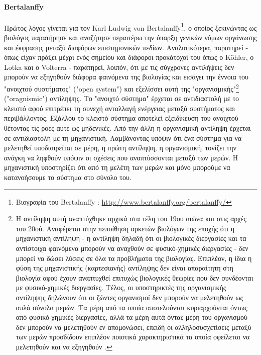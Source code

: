 \documentclass[a4paper,12pt,twoside]{report}
\begin{document}
{			\paragraph{Bertalanffy}{Πρώτος λόγος γίνεται για τον Karl Ludwig von Bertalanffy\footnote{Βιογραφία του Bertalanffy : \url{http://www.bertalanffy.org/bertalanffy/}}, ο οποίος ξεκινώντας ως βιολόγος παρατήρησε και αναζήτησε περαιτέρω την ύπαρξη γενικών νόμων οργάνωσης και έκφρασης μεταξύ διαφόρων επιστημονικών πεδίων. Αναλυτικότερα, παρατηρεί - όπως είχαν πράξει μέχρι ενός σημείου και διάφοροι προκάτοχοί του όπως ο K\"ohler, ο Lotka και ο Volterra \cite[σελ. 11]{GeneralSystemsTheory:Bertalanffy1972} \cite[σελ. 412]{TheHistoryΑndStatusΟfGeneralSystemsTheory:Bertalanffy} - παρατηρεί, λοιπόν, ότι με τις σύγχρονες αντιλήψεις δεν μπορούν να εξηγηθούν διάφορα φαινόμενα της βιολογίας και εισάγει την έννοια του "ανοιχτού συστήματος" ("open system") και εξελίσσει αυτή της "οργανισμικής"\footnote{Η αντίληψη αυτή αναπτύχθηκε αρχικά στα τέλη του 19ου αιώνα και στις αρχές του 20ού. Αναφέρεται στην πεποίθηση αρκετών βιολόγων της εποχής ότι η μηχανιστική αντίληψη - η αντίληψη δηλαδή ότι οι βιολογικές διεργασίες και τα αντίστοιχα φαινόμενα μπορούν να αναχθούν σε φυσικό-χημικές διεργασίες - δεν μπορεί να δώσει λύσεις σε όλα τα προβλήματα της βιολογίας. Επιπλέον, η ίδια η φύση της μηχανιστικής (καρτεσιανής) αντίληψης δεν είναι απαραίτητη στη βιολογία αφού έχουν αναπτυχθεί επιτυχώς βιολογικές θεωρίες που δεν συνδέονται με φυσικό-χημικές διεργασίες. Τέλος, οι υποστηρικτές της οργανισμικής αντίληψης δηλώνουν ότι οι ζώντες οργανισμοί δεν μπορούν να μελετηθούν ως απλά σύνολα μερών. Τα μέρη από τα οποία αποτελούνται κυριαρχούνται όντως από φυσικό-χημικές διεργασίες, αλλά τα μέρη αυτά όντας μέρη του οργανισμού δεν μπορούν να μελετηθούν εν απομονώσει, επειδή οι αλληλοσυσχετίσεις μεταξύ των μερών προσδίδουν επιπλέον ποιοτικά χαρακτηριστικά τα οποία οφείλεται να μελετηθούν και να εξηγηθούν \cite[σελίδες 327-329]{MechanisticExplanationAndOrganismicBiology:Nagel1951}.}		 ("oragnismic") αντίληψης. Το "ανοιχτό σύστημα" έρχεται σε αντιδιαστολή με το κλειστό αφού επιτρέπει τη συνεχή ανταλλαγή ενέργειας μεταξύ συστήματος και περιβάλλοντος. Εξάλλου το κλειστό σύστημα αποτελεί εξειδίκευση του ανοιχτού θέτοντας τις ροές αυτέ ως μηδενικές. Από την άλλη η οργανισμική αντίληψη έρχεται σε αντιδιαστολή με τη μηχανιστική. Λαμβάνοντας υπόψιν ότι ένα σύστημα για να μελετηθεί υποδιαιρείται σε μέρη, η πρώτη αντίληψη, η οργανισμική, τονίζει την ανάγκη να ληφθούν υπόψιν οι σχέσεις που αναπτύσσονται μεταξύ των μερών. Η μηχανιστική υποστηρίζει ότι από τη μελέτη των μερών και μόνο μπορούμε να κατανοήσουμε το σύστημα στο σύνολο του. 
			}
}
\end{document}
